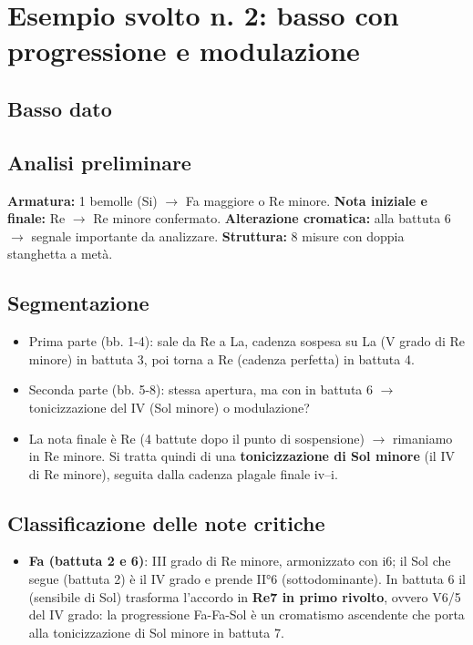 \section{Esempio svolto n. 2: basso con progressione e modulazione}
\label{sec:esempio2}

\subsection{Basso dato}

\subsection{Analisi preliminare}

\textbf{Armatura:} 1 bemolle (Si\bemolle{}) $\rightarrow$ Fa maggiore o Re minore.
\textbf{Nota iniziale e finale:} Re $\rightarrow$ Re minore confermato.
\textbf{Alterazione cromatica:} \Fadiesis{} alla battuta 6 $\rightarrow$ segnale importante da analizzare.
\textbf{Struttura:} 8 misure con doppia stanghetta a metà.

\subsection{Segmentazione}

\begin{itemize}
	\item Prima parte (bb. 1-4): sale da Re a La, cadenza sospesa su La (V grado di Re minore) in battuta 3, poi torna a Re (cadenza perfetta) in battuta 4.
	\item Seconda parte (bb. 5-8): stessa apertura, ma con \Fadiesis{} in battuta 6 $\rightarrow$ tonicizzazione del IV (Sol minore) o modulazione?
	\item La nota finale è Re (4 battute dopo il punto di sospensione) $\rightarrow$ rimaniamo in Re minore. Si tratta quindi di una \textbf{tonicizzazione di Sol minore} (il IV di Re minore), seguita dalla cadenza plagale finale iv--i.
\end{itemize}

\subsection{Classificazione delle note critiche}

\begin{itemize}
	\item \textbf{Fa (battuta 2 e 6)}: III grado di Re minore, armonizzato con i6; il Sol che segue (battuta 2) è il IV grado e prende II°6 (sottodominante). In battuta 6 il \Fadiesis{} (sensibile di Sol) trasforma l'accordo in \textbf{Re7 in primo rivolto}, ovvero V6/5 del IV grado: la progressione Fa-Fa\diesis{}-Sol è un cromatismo ascendente che porta alla tonicizzazione di Sol minore in battuta 7.
\end{itemize}

